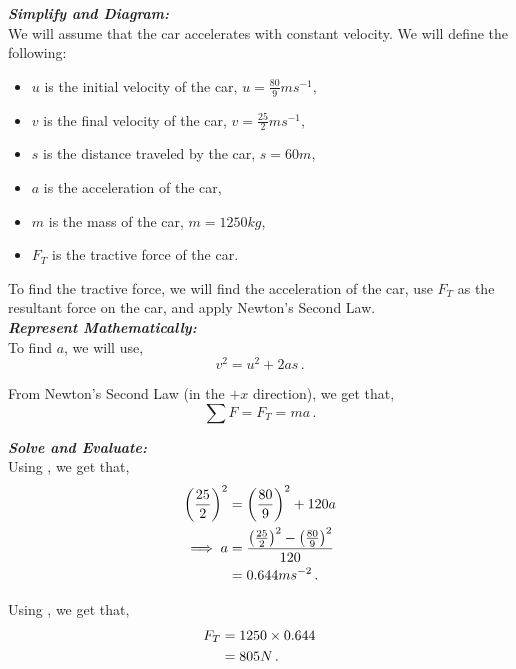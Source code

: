 \begin{subquestions}
\textbf{\textit{Simplify and Diagram:}} \\
We will assume that the car accelerates with constant velocity. We will define the following:
\begin{itemize}
	\item $u$ is the initial velocity of the car, $u=\frac{80}{9}ms^{-1}$,
	\item $v$ is the final velocity of the car, $v=\frac{25}{2}ms^{-1}$,
	\item $s$ is the distance traveled by the car, $s=60m$,
	\item $a$ is the acceleration of the car,
	\item $m$ is the mass of the car, $m=1250kg$,
	\item $F_T$ is the tractive force of the car.
\end{itemize}
To find the tractive force, we will find the acceleration of the car, use $F_T$ as the resultant force on the car, and apply Newton's Second Law.\\
	

	
	
\textbf{\textit{Represent Mathematically:}} \\
To find $a$, we will use,
\begin{equation}
	v^2=u^2+2as \label{2006:q5:AEqn1} \,.
\end{equation}

From Newton's Second Law (in the $+x$ direction), we get that,
\begin{equation}
	\sum F = F_T = ma \label{2006:q5:FEqn1} \,.
\end{equation}




\textbf{\textit{Solve and Evaluate:}} \\
Using , we get that,
\begin{align}
	\left(\frac{25}{2}\right)^2 & = \left(\frac{80}{9}\right)^2 + 120a \nonumber \\
	\implies a & = \frac{\left(\frac{25}{2}\right)^2-\left(\frac{80}{9}\right)^2}{120} \nonumber \\
	           & = 0.644ms^{-2} \,.
\end{align}

Using , we get that,
\begin{align}
	F_T & = 1250 \times 0.644 \nonumber \\
	    & = 805N \,.
\end{align}

\end{subquestions}